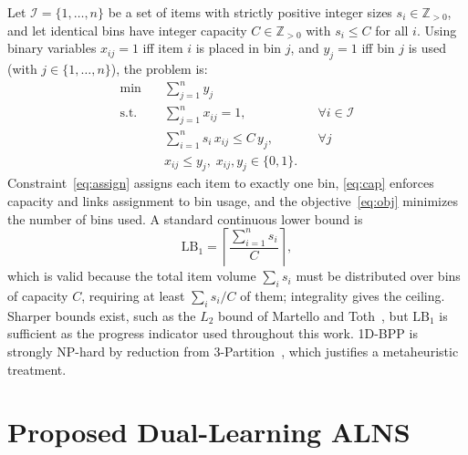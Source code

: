 \documentclass[conference]{IEEEtran}
\begin{document}
Let $\mathcal{I}=\{1,\dots,n\}$ be a set of items with strictly positive integer
sizes $s_i\in\mathbb{Z}_{>0}$, and let identical bins have integer capacity
$C\in\mathbb{Z}_{>0}$ with $s_i\le C$ for all $i$. Using binary variables
$x_{ij}=1$ iff item $i$ is placed in bin $j$, and $y_j=1$ iff bin $j$ is used
(with $j\in\{1,\dots,n\}$), the problem is:
\begin{align}
	\min \quad       & \sum_{j=1}^{n} y_j \label{eq:obj}                                                     \\
	\text{s.t.}\quad & \sum_{j=1}^{n} x_{ij}=1,               &  & \forall i\in\mathcal{I} \label{eq:assign} \\
	                 & \sum_{i=1}^{n} s_i\,x_{ij}\le C\,y_j,  &  & \forall j \label{eq:cap}                  \\
	                 & x_{ij}\le y_j,\; x_{ij},y_j\in\{0,1\}. &  & \label{eq:link}
\end{align}
Constraint~\eqref{eq:assign} assigns each item to exactly one bin,
\eqref{eq:cap} enforces capacity and links assignment to bin usage, and the
objective~\eqref{eq:obj} minimizes the number of bins used. A standard continuous
lower bound is
\begin{equation}
	\mathrm{LB}_1=\left\lceil \frac{\sum_{i=1}^{n} s_i}{C} \right\rceil ,\label{eq:lb}
\end{equation}
which is valid because the total item volume $\sum_i s_i$ must be distributed over
bins of capacity $C$, requiring at least $\sum_i s_i / C$ of them; integrality
gives the ceiling. Sharper bounds exist, such as the $L_2$ bound of Martello and
Toth~\cite{bMartello}, but $\mathrm{LB}_1$ is sufficient as the progress indicator
used throughout this work. 1D-BPP is strongly NP-hard by reduction from
3-Partition~\cite{bGarey}, which justifies a metaheuristic treatment.

\section{Proposed Dual-Learning ALNS}\label{sec:approach}
\end{document}
